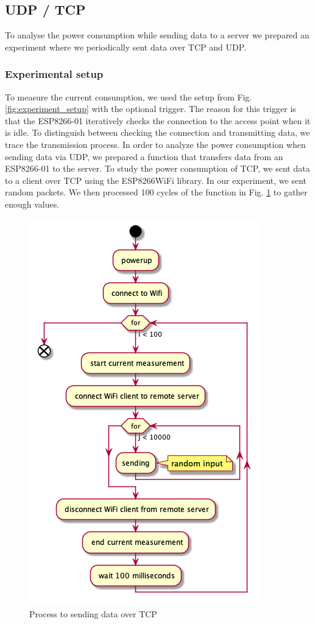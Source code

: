 \subsection{UDP / TCP}
\label{udptcp:measure}
To analyse the power consumption while sending data to a server we prepared an 
experiment where we periodically sent data over TCP and UDP.\\

\subsubsection{Experimental setup}
To measure the current consumption, we used the setup from Fig. \ref{fig:experiment_setup} 
with the optional trigger.
The reason for this trigger is that the ESP8266-01 iteratively checks the connection to the access point when it is idle.
To distinguish between checking the connection and transmitting data, we trace the transmission process.
In order to analyze the power consumption when sending data via UDP,
we prepared a function that transfers data from an ESP8266-01 to the server.
To study the power consumption of TCP,
we sent data to a client over TCP using the ESP8266WiFi library. In our experiment, we sent random packets.
We then processed 100 cycles of the function in Fig. \ref{fig:tcp_uml} to gather enough values.

\begin{figure}[H]
    \centering
    \includegraphics[width = 0.6 \linewidth]{fig/udp_tcp/tcp_uml.png}
    \caption{Process to sending data over TCP}
    \label{fig:tcp_uml}
\end{figure}

